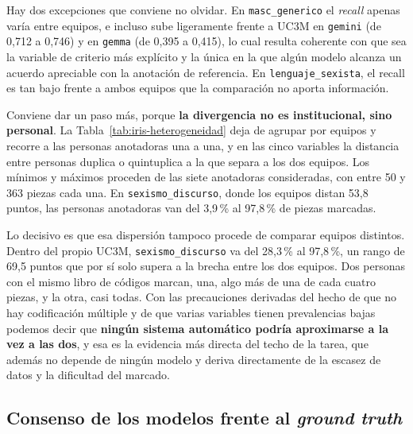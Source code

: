 Hay dos excepciones que conviene no olvidar. En \texttt{masc\_generico} el \textit{recall}
apenas varía entre equipos, e incluso sube ligeramente frente a UC3M en
\texttt{gemini} (de 0,712 a 0,746) y en \texttt{gemma} (de 0,395 a 0,415), lo cual
resulta coherente con que sea la variable de criterio más explícito y la única en la
que algún modelo alcanza un acuerdo apreciable con la anotación de referencia. En \texttt{lenguaje\_sexista}, el recall es tan bajo frente a
ambos equipos que la comparación no aporta información.

Conviene dar un paso más, porque \textbf{la divergencia no es institucional, sino
personal}. La Tabla~\ref{tab:iris-heterogeneidad} deja de agrupar por equipos y
recorre a las personas anotadoras una a una, y en las cinco variables la distancia entre
personas duplica o quintuplica a la que separa a los dos equipos. Los mínimos y máximos
proceden de las siete anotadoras consideradas, con entre 50 y 363 piezas cada una. En
\texttt{sexismo\_discurso}, donde los equipos distan 53,8 puntos, las personas
anotadoras van del 3,9\,\% al 97,8\,\% de piezas marcadas.



Lo decisivo es que esa dispersión tampoco procede de comparar equipos distintos.
Dentro del propio UC3M, \texttt{sexismo\_discurso} va del 28,3\,\% al 97,8\,\%, un
rango de 69,5 puntos que por sí solo supera a la brecha entre los dos equipos. Dos
personas con el mismo libro de códigos marcan, una, algo más de
una de cada cuatro piezas, y la otra, casi todas. Con las precauciones derivadas del hecho de que no hay codificación múltiple y de que varias variables tienen prevalencias bajas podemos decir que \textbf{ningún sistema automático
podría aproximarse a la vez a las dos}, y esa es la evidencia más directa del techo de
la tarea, que además no depende de ningún modelo y deriva directamente de la escasez de datos y la dificultad del marcado.

\subsection{Consenso de los modelos frente al \textit{ground truth}}

